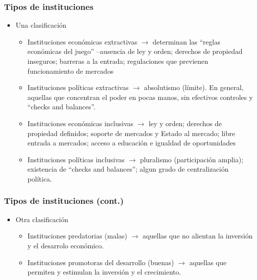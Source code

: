 \documentclass[handout,final,xcolor=dvipsnames]{beamer}
\begin{document}
\begin{frame}\frametitle{Tipos de instituciones}
\begin{itemize}\itemsep 15pt
\item Una clasificación
\begin{itemize}\itemsep 15pt \medskip
\item Instituciones económicas extractivas $\longrightarrow$ determinan las ``reglas
  económicas del juego'' --ausencia de ley y orden; derechos de
  propiedad inseguros; barreras a la entrada; regulaciones que
  previenen funcionamiento de mercados
  \item Instituciones políticas extractivas $\longrightarrow$
    absolutismo (límite). En general, aquellas que concentran el poder
    en pocas manos, sin efectivos controles y ``checks and
    balances''.
    \item Instituciones económicas inclusivas $\longrightarrow$ ley y
      orden; derechos de propiedad definidos; soporte de mercados y
      Estado al mercado; libre entrada a mercados; acceso a educación
      e igualdad de oportunidades
      \item Instituciones políticas inclusivas $\longrightarrow$
        pluralismo (participación amplia); existencia de ``checks and
        balances''; algun grado de centralización política.
\end{itemize}
\end{itemize}
\end{frame}




\begin{frame}\frametitle{Tipos de instituciones (cont.)}
\begin{itemize}\itemsep 15pt \medskip
\item Otra clasificación
\begin{itemize}\itemsep 15pt \medskip
\item Instituciones predatorias (malas) $\longrightarrow$ aquellas que
  no alientan la inversión y el desarrolo económico. 
\item Instituciones promotoras del desarrollo (buenas)
  $\longrightarrow$ aquellas que permiten y estimulan la inversión y
  el crecimiento. 
\end{itemize}
\end{itemize}
\end{frame}
\end{document}
